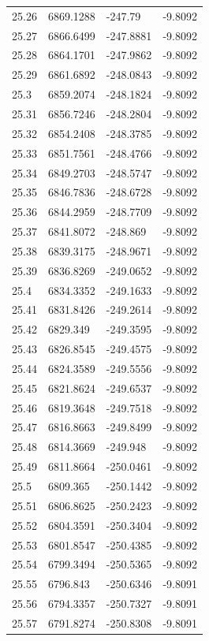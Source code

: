 \begin{table}[H]
\begin{tabular}{llll}
25.26 & 6869.1288 & -247.79 & -9.8092 \\
25.27 & 6866.6499 & -247.8881 & -9.8092 \\
25.28 & 6864.1701 & -247.9862 & -9.8092 \\
25.29 & 6861.6892 & -248.0843 & -9.8092 \\
25.3 & 6859.2074 & -248.1824 & -9.8092 \\
25.31 & 6856.7246 & -248.2804 & -9.8092 \\
25.32 & 6854.2408 & -248.3785 & -9.8092 \\
25.33 & 6851.7561 & -248.4766 & -9.8092 \\
25.34 & 6849.2703 & -248.5747 & -9.8092 \\
25.35 & 6846.7836 & -248.6728 & -9.8092 \\
25.36 & 6844.2959 & -248.7709 & -9.8092 \\
25.37 & 6841.8072 & -248.869 & -9.8092 \\
25.38 & 6839.3175 & -248.9671 & -9.8092 \\
25.39 & 6836.8269 & -249.0652 & -9.8092 \\
25.4 & 6834.3352 & -249.1633 & -9.8092 \\
25.41 & 6831.8426 & -249.2614 & -9.8092 \\
25.42 & 6829.349 & -249.3595 & -9.8092 \\
25.43 & 6826.8545 & -249.4575 & -9.8092 \\
25.44 & 6824.3589 & -249.5556 & -9.8092 \\
25.45 & 6821.8624 & -249.6537 & -9.8092 \\
25.46 & 6819.3648 & -249.7518 & -9.8092 \\
25.47 & 6816.8663 & -249.8499 & -9.8092 \\
25.48 & 6814.3669 & -249.948 & -9.8092 \\
25.49 & 6811.8664 & -250.0461 & -9.8092 \\
25.5 & 6809.365 & -250.1442 & -9.8092 \\
25.51 & 6806.8625 & -250.2423 & -9.8092 \\
25.52 & 6804.3591 & -250.3404 & -9.8092 \\
25.53 & 6801.8547 & -250.4385 & -9.8092 \\
25.54 & 6799.3494 & -250.5365 & -9.8092 \\
25.55 & 6796.843 & -250.6346 & -9.8091 \\
25.56 & 6794.3357 & -250.7327 & -9.8091 \\
25.57 & 6791.8274 & -250.8308 & -9.8091 \\

\end{tabular}
\end{table}
